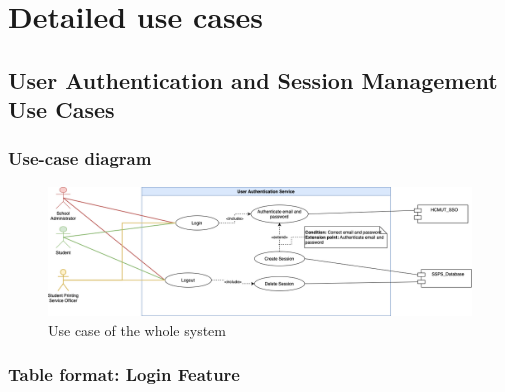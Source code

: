 \section{Detailed use cases}

\subsection{User Authentication and Session Management Use Cases}

\subsubsection{Use-case diagram}

\begin{figure}[H]
  \includegraphics[max width=0.9\linewidth]{chapters/3. use-case-diagram/authentication-use-case-diagram.png}
  \caption{Use case of the whole system}%
\end{figure}

\subsubsection{Table format: Login Feature}

